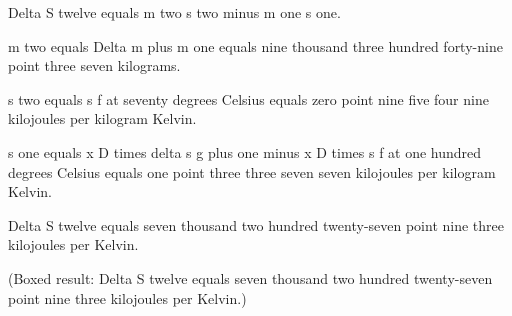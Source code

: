 Delta S twelve equals m two s two minus m one s one.  

m two equals Delta m plus m one equals nine thousand three hundred forty-nine point three seven kilograms.  

s two equals s f at seventy degrees Celsius equals zero point nine five four nine kilojoules per kilogram Kelvin.  

s one equals x D times delta s g plus one minus x D times s f at one hundred degrees Celsius equals one point three three seven seven kilojoules per kilogram Kelvin.  

Delta S twelve equals seven thousand two hundred twenty-seven point nine three kilojoules per Kelvin.  

(Boxed result: Delta S twelve equals seven thousand two hundred twenty-seven point nine three kilojoules per Kelvin.)
